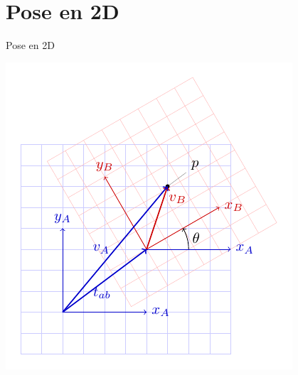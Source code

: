 \documentclass[presentation,aspectratio=169]{beamer}
\begin{document}
\section{Pose en 2D}
\label{sec:org6a76eeb}

\begin{frame}[label={sec:org7ad32f8}]{Pose en 2D}
\begin{center}
\includegraphics[height=0.9\textheight]{../figures/2d-transform}
\end{center}
\end{frame}
\end{document}
